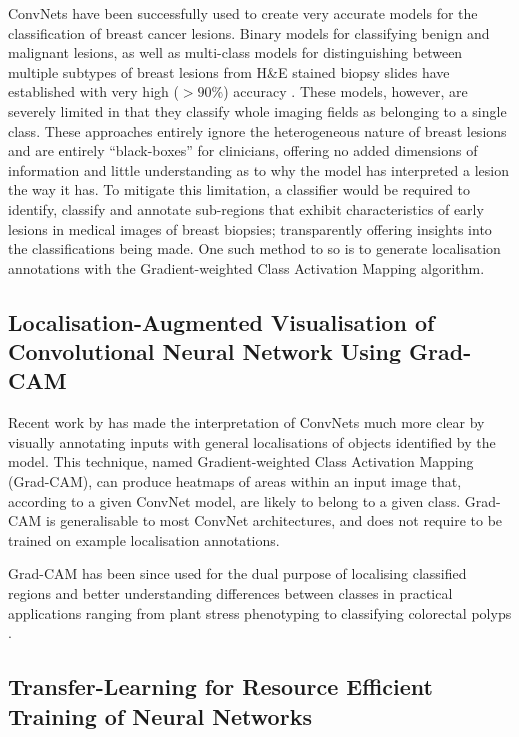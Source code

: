 ConvNets have been successfully used to create very accurate models for the classification of breast cancer lesions. Binary models for classifying benign and malignant lesions, as well as multi-class models for distinguishing between multiple subtypes of breast lesions from H\&E stained biopsy slides have established with very high ($>90\%$) accuracy \citep{wei2017, han2017}. These models, however, are severely limited in that they classify whole imaging fields as belonging to a single class. These approaches entirely ignore the heterogeneous nature of breast lesions and are entirely ``black-boxes'' for clinicians, offering no added dimensions of information and little understanding as to why the model has interpreted a lesion the way it has. To mitigate this limitation, a classifier would be required to identify, classify and annotate sub-regions that exhibit characteristics of early lesions in medical images of breast biopsies; transparently offering insights into the classifications being made. One such method to so is to generate localisation annotations with the Gradient-weighted Class Activation Mapping algorithm. \par

\subsection{Localisation-Augmented Visualisation of Convolutional Neural Network Using Grad-CAM}

Recent work by \citeauthor{selvaraju2016} has made the interpretation of ConvNets much more clear by visually annotating inputs with general localisations of objects identified by the model. This technique, named Gradient-weighted Class Activation Mapping (Grad-CAM), can produce heatmaps of areas within an input image that, according to a given ConvNet model, are likely to belong to a given class. Grad-CAM is generalisable to most ConvNet architectures, and does not require to be trained on example localisation annotations.\par

Grad-CAM has been since used for the dual purpose of localising classified regions and better understanding differences between classes in practical applications ranging from plant stress phenotyping to classifying colorectal polyps \citep{ghosal2017,korbar2017}.\par

\subsection{Transfer-Learning for Resource Efficient Training of Neural Networks}

